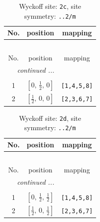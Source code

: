 \documentclass[fleqn,8pt]{jsarticle}
\begin{document}
\renewcommand{\arraystretch}{1.2}
\begin{longtable}{ccc}
\caption{Wyckoff site: {\tt 2c}, site symmetry: {\tt ..2/m}}
 \\
 \hline \hline
No. & position & mapping \\ \hline \endfirsthead

\multicolumn{2}{l}{\tablename\ \thetable{}} \\
 \hline \hline
No. & position & mapping \\ \hline \endhead

 \hline \hline
\multicolumn{2}{r}{\footnotesize\it continued ...} \\ \endfoot

 \hline \hline
\multicolumn{2}{r}{} \\ \endlastfoot

1 & $\left[ 0,\, \frac{1}{2},\, 0 \right]$ & {\tt [1,4,5,8]} \\ \hline
2 & $\left[ \frac{1}{2},\, 0,\, 0 \right]$ & {\tt [2,3,6,7]} \\
\end{longtable}
\renewcommand{\arraystretch}{1.2}
\begin{longtable}{ccc}
\caption{Wyckoff site: {\tt 2d}, site symmetry: {\tt ..2/m}}
 \\
 \hline \hline
No. & position & mapping \\ \hline \endfirsthead

\multicolumn{2}{l}{\tablename\ \thetable{}} \\
 \hline \hline
No. & position & mapping \\ \hline \endhead

 \hline \hline
\multicolumn{2}{r}{\footnotesize\it continued ...} \\ \endfoot

 \hline \hline
\multicolumn{2}{r}{} \\ \endlastfoot

1 & $\left[ 0,\, \frac{1}{2},\, \frac{1}{2} \right]$ & {\tt [1,4,5,8]} \\ \hline
2 & $\left[ \frac{1}{2},\, 0,\, \frac{1}{2} \right]$ & {\tt [2,3,6,7]} \\
\end{longtable}
\renewcommand{\arraystretch}{1.2}
\end{document}
